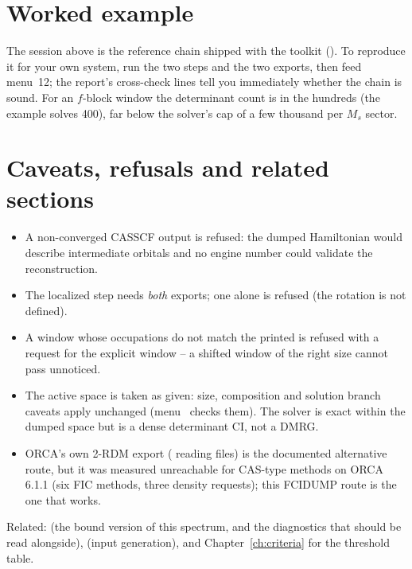 \section{Worked example}

The session above is the reference chain shipped with the toolkit
(). To reproduce it for your own system,
run the two steps and the two exports, then feed menu~12; the report's
cross-check lines tell you immediately whether the chain is sound. For an
$f$-block window the determinant count is in the hundreds (the example solves
400), far below the solver's cap of a few thousand per $M_s$ sector.

\section{Caveats, refusals and related sections}

\begin{refusalbox}
\begin{itemize}
  \item A non-converged CASSCF output is refused: the dumped Hamiltonian would
    describe intermediate orbitals and no engine number could validate the
    reconstruction.
  \item The localized step needs \emph{both} exports; one alone is refused
    (the rotation is not defined).
  \item A window whose occupations do not match the printed  is
    refused with a request for the explicit window -- a shifted window of the
    right size cannot pass unnoticed.
  \item The active space is taken as given: size, composition and solution
    branch caveats apply unchanged (menu~ checks them). The solver is
    exact within the dumped space but is a dense determinant CI, not a DMRG.
  \item ORCA's own 2-RDM export ( reading 
    files) is the documented alternative route, but it was measured
    unreachable for CAS-type methods on ORCA 6.1.1 (six FIC methods, three
    density requests); this FCIDUMP route is the one that works.
\end{itemize}
\end{refusalbox}

Related:  (the bound version of this spectrum, and the diagnostics
that should be read alongside),  (input generation), and
Chapter~\ref{ch:criteria} for the threshold table.
